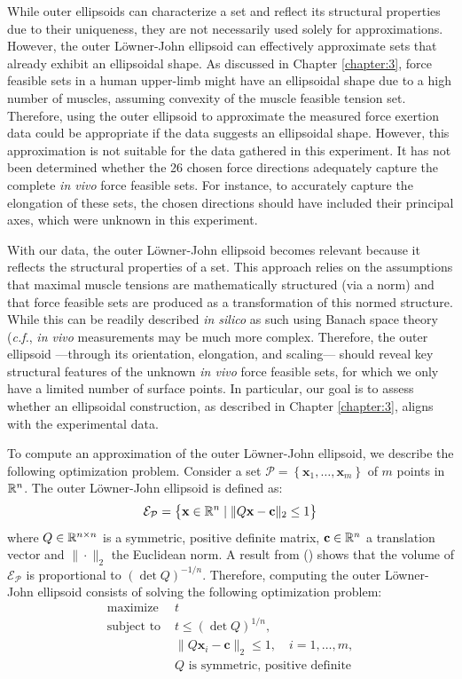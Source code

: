 While outer ellipsoids can characterize a set and reflect its structural properties due to their uniqueness, they are not necessarily used solely for approximations. However, the outer Löwner-John ellipsoid can effectively approximate sets that already exhibit an ellipsoidal shape. As discussed in Chapter \ref{chapter:3}, force feasible sets in a human upper-limb might have an ellipsoidal shape due to a high number of muscles, assuming convexity of the muscle feasible tension set. Therefore, using the outer ellipsoid to approximate the measured force exertion data could be appropriate if the data suggests an ellipsoidal shape. However, this approximation is not suitable for the data gathered in this experiment. It has not been determined whether the 26 chosen force directions adequately capture the complete \emph{in vivo} force feasible sets. For instance, to accurately capture the elongation of these sets, the chosen directions should have included their principal axes, which were unknown in this experiment.

With our data, the outer Löwner-John ellipsoid becomes relevant because it reflects the structural properties of a set. This approach relies on the assumptions that maximal muscle tensions are mathematically structured (via a norm) and that force feasible sets are produced as a transformation of this normed structure. While this can be readily described \emph{in silico} as such using Banach space theory (\emph{c.f.}, \emph{in vivo} measurements may be much more complex. Therefore, the outer ellipsoid —through its orientation, elongation, and scaling— should reveal key structural features of the unknown \emph{in vivo} force feasible sets, for which we only have a limited number of surface points. In particular, our goal is to assess whether an ellipsoidal construction, as described in Chapter \ref{chapter:3}, aligns with the experimental data.

To compute an approximation of the outer Löwner-John ellipsoid, we describe the following optimization problem. Consider a set $\mathcal{P} = \left\{\mathbf{x}_1, \dots, \mathbf{x}_m\right\}$ of $m$ points in $\mathbb{R}^n$. The outer Löwner-John ellipsoid is defined as:
$$\mathcal{E}_{\mathcal{P}} = \left\{\mathbf{x}\in \mathbb{R}^n \mid \| Q\mathbf{x} - \mathbf{c} \|_2 \leq 1 \right\}$$
where $Q\in \mathbb{R}^{n\times n}$ is a symmetric, positive definite matrix, $\mathbf{c}\in\mathbb{R}^n$ a translation vector and $\|\cdot \|_2$ the Euclidean norm. A result from (\cite{johnExtremumProblemsWithInequalities1948}) shows that the volume of $\mathcal{E}_{\mathcal{P}}$ is proportional to $(\det{Q})^{-1/n}$. Therefore, computing the outer Löwner-John ellipsoid consists of solving the following optimization problem:
\begin{align*}
    \text{maximize } & t \\
    \text{subject to } & t\leq (\det{Q})^{1/n}, \\
    & \|Q\mathbf{x}_i - \mathbf{c}\|_2 \leq 1,\quad i=1,\dots, m, \\
    & Q \text{ is symmetric, positive definite}
\end{align*}

